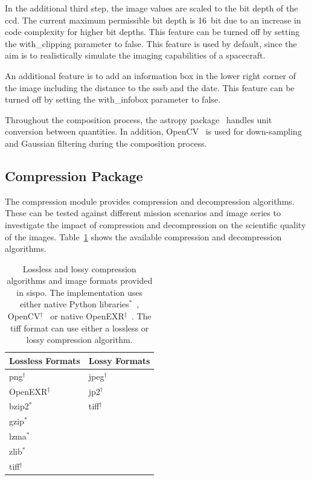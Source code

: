 In the additional third step, the image values are scaled to the bit depth of the \gls{ccd}. The current maximum permissible bit depth is \SI{16}{bit} due to an increase in code complexity for higher bit depths. This feature can be turned off by setting the with\_clipping parameter to false. This feature is used by default, since the aim is to realistically simulate the imaging capabilities of a spacecraft.

An additional feature is to add an information box in the lower right corner of the image including the distance to the \gls{sssb} and the date. This feature can be turned off by setting the with\_infobox parameter to false.

Throughout the composition process, the astropy package~\cite{robitaille2013astropy, price2018astropy} handles unit conversion between quantities. In addition, OpenCV~\cite{opencv_library} is used for down-sampling and Gaussian filtering during the composition process.

\subsection{Compression Package}
The compression module provides compression and decompression algorithms. These can be tested against different mission scenarios and image series to investigate the impact of compression and decompression on the scientific quality of the images. Table~\ref{tab:compression_format} shows the available compression and decompression algorithms.

\begin{table}[htb]
    \centering
    \caption{Lossless and lossy compression algorithms and image formats provided in \gls{sispo}. The implementation uses either native Python libraries$^{\ast}$~\cite{FoundationDataArchiving}, OpenCV$^{\dagger}$~\cite{opencv_library} or native OpenEXR$^{\ddagger}$~\cite{openexr}. The \gls{tiff} format can use either a lossless or lossy compression algorithm.}
    \label{tab:compression_format}
    \begin{tabular}{l|l}
        \textbf{Lossless Formats}  & \textbf{Lossy Formats} \\ \hline
        \gls{png}$^{\dagger}$      & \gls{jpeg}$^{\dagger}$  \\
        OpenEXR$^{\ddagger}$       & \gls{jp2}$^{\dagger}$   \\
        bzip2$^{\ast}$             & \gls{tiff}$^{\dagger}$  \\
        gzip$^{\ast}$              &                \\
        \gls{lzma}$^{\ast}$        &                \\
        zlib$^{\ast}$              &     \\
        \gls{tiff}$^{\dagger}$     &  
    \end{tabular}
\end{table}

